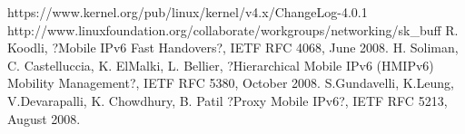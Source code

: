 \begin{thebibliography}{90}   
\rhead[\fancyplain{}{\bfseries \leftmark}]{\fancyplain{}{\bfseries
\thepage}}
 https://www.kernel.org/pub/linux/kernel/v4.x/ChangeLog-4.0.1
 http://www.linuxfoundation.org/collaborate/workgroups/networking/sk\_buff
 R. Koodli, ?Mobile IPv6 Fast Handovers?, IETF RFC 4068, June 2008.
  H. Soliman, C. Castelluccia, K. ElMalki, L. Bellier, ?Hierarchical Mobile IPv6 (HMIPv6) Mobility Management?, IETF RFC 5380, October 2008.
 S.Gundavelli, K.Leung, V.Devarapalli, K. Chowdhury, B. Patil ?Proxy Mobile IPv6?, IETF RFC 5213, August 2008.
\end{thebibliography}

